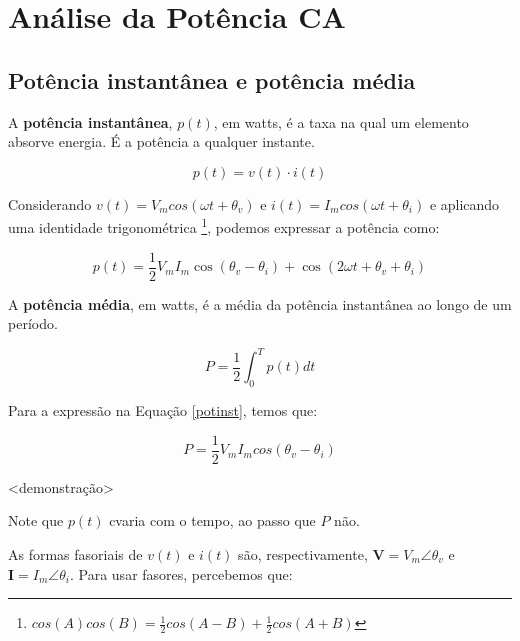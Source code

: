 \chapter{Análise da Potência CA}

\section{Potência instantânea e potência média}

A \textbf{potência instantânea}, $p(t)$, em watts, é a taxa na qual um elemento absorve energia. É a potência a qualquer instante.

\begin{equation}
 p(t) = v(t) \cdot i(t)
\end{equation}

Considerando $v(t) = V_m cos(\omega t + \theta_v)$ e $i(t) = I_m cos(\omega t + \theta_i)$ e aplicando uma identidade trigonométrica \footnote{$cos(A)cos(B) = \frac{1}{2}cos(A-B) + \frac{1}{2}cos(A+B)$}, podemos expressar a potência como:

\begin{equation} \label{potinst}
 p(t) = \frac{1}{2}V_m I_m \cos(\theta_v - \theta_i) + \cos(2 \omega t + \theta_v + \theta_i)
\end{equation}


A \textbf{potência média}, em watts, é a média da potência instantânea ao longo de um período.

\begin{equation}
 P = \frac{1}{2} \int_0^T p(t) dt
\end{equation}

Para a expressão na Equação \ref{potinst}, temos que:

\begin{equation}
 P = \frac{1}{2} V_m I_m cos(\theta_v - \theta_i)
\end{equation}

<demonstração>

Note que $p(t)$ cvaria com o tempo, ao passo que $P$ não.

As formas fasoriais de $v(t)$ e $i(t)$  são, respectivamente, $\mathbf{V} = V_m \angle \theta_v$ e $\mathbf{I} = I_m \angle \theta_i$. Para usar fasores, percebemos que:

